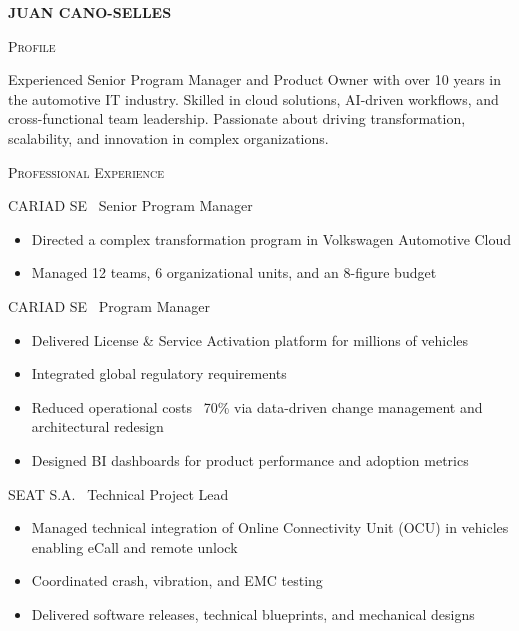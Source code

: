 \documentclass[11pt, a4paper]{article}
\newcommand{\headright}[1]{\vspace*{2ex}\textsc{\large\color{cvblue}#1}\par%
  \vspace*{-1.4ex}{\color{cvblue}\hrulefill}\par}
\newlength{\SideBarW}
\newlength{\TitleBulletGap}     %
\newlength{\BetweenJobsGap}     %
\newenvironment{job}[3]{%
  \vspace{\BetweenJobsGap}%
  \noindent\textsc{#1} \textemdash\ #2\hfill %
  \begin{itemize}[leftmargin=1.6em,label=--,labelsep=0.5em,itemsep=0.45ex,topsep=0.2ex]
}{%
  \end{itemize}%
}
\begin{document}
\begin{minipage}[t]{\dimexpr\textwidth-\SideBarW-3mm\relax}
  \setlength{\parskip}{0.8ex}
  \setlength{\leftskip}{4mm}
  \setlength{\rightskip}{6mm}

  \vspace*{6mm}
  {\fontsize{28}{30}\sffont\bfseries\MakeUppercase{\textcolor{cvblue}{Juan Cano-Selles}}}\par
  \vspace*{1.0ex}

  \headright{Profile}
  Experienced Senior Program Manager and Product Owner with over 10 years in the automotive IT industry. Skilled in cloud solutions, AI-driven workflows, and cross-functional team leadership. Passionate about driving transformation, scalability, and innovation in complex organizations.

  \headright{Professional Experience}

  \begin{job}{CARIAD SE}{Senior Program Manager}{Mar 2024 -- Sep 2025}
    \item Directed a complex transformation program in Volkswagen Automotive Cloud
    \item Managed 12 teams, 6 organizational units, and an 8-figure budget
  \end{job}

  \begin{job}{CARIAD SE}{Program Manager}{Nov 2020 -- Mar 2024}
    \item Delivered License \& Service Activation platform for millions of vehicles
    \item Integrated global regulatory requirements
    \item Reduced operational costs ~70\% via data-driven change management and architectural redesign
    \item Designed BI dashboards for product performance and adoption metrics
  \end{job}

  \begin{job}{SEAT S.A.}{Technical Project Lead}{Mar 2019 -- Nov 2020}
    \item Managed technical integration of Online Connectivity Unit (OCU) in vehicles enabling eCall and remote unlock
    \item Coordinated crash, vibration, and EMC testing
    \item Delivered software releases, technical blueprints, and mechanical designs
  \end{job}


\end{minipage}
\end{document}
